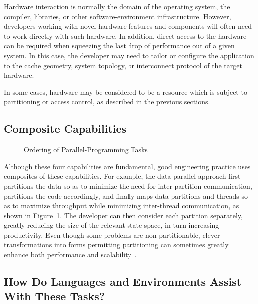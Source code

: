 Hardware interaction is normally the domain of the operating system,
the compiler, libraries, or other software-environment infrastructure.
However, developers working with novel hardware features and components
will often need to work directly with such hardware.
In addition, direct access to the hardware can be required when squeezing
the last drop of performance out of a given system.
In this case, the developer may need to tailor or configure the application
to the cache geometry, system topology, or interconnect protocol of the
target hardware.

In some cases, hardware may be considered to be a resource which
is subject to partitioning or access control, as described in
the previous sections.

\subsection{Composite Capabilities}
\label{sec:Composite Capabilities}

\begin{figure}[tb]
\centering
{}
\caption{Ordering of Parallel-Programming Tasks}
\label{fig:intro:Ordering of Parallel-Programming Tasks}
\end{figure}

Although these four capabilities are fundamental,
good engineering practice uses composites of
these capabilities.
For example, the data-parallel approach first
partitions the data so as to minimize the need for
inter-partition communication, partitions the code accordingly,
and finally maps data partitions and threads so as to maximize
throughput while minimizing inter-thread communication,
as shown in
Figure~\ref{fig:intro:Ordering of Parallel-Programming Tasks}.
The developer can then
consider each partition separately, greatly reducing the size
of the relevant state space, in turn increasing productivity.
Even though some problems are non-partitionable,
clever transformations into forms permitting partitioning can
sometimes greatly enhance
both performance and scalability~\cite{PanagiotisMetaxas1999PDCS}.

\subsection{How Do Languages and Environments Assist With These Tasks?}
\label{sec:intro:How Do Languages and Environments Assist With These Tasks?}

